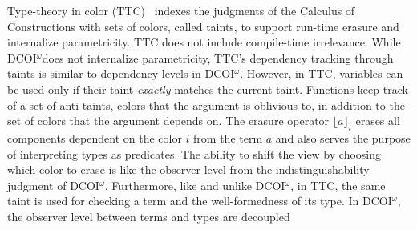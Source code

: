 \documentclass[acmsmall, screen=true, nonacm=true,
  review=\ifpublic false\else true\fi,
  anonymous=\ifanonymous true\else false\fi
]{acmart}
\makeatletter
\newcommand{\name}{\texorpdfstring{DCOI$^{\omega}$\@\xspace}{DCOI-omega}}
\providecommand{\DIFadd}[1]{{\protect\color{blue}\uwave{#1}}} %
\providecommand{\DIFaddbegin}{} %
\makeatother
\begin{document}


Type-theory in color (TTC)~\citep{bernardy:color} indexes the judgments of the
Calculus of Constructions with sets of colors, called taints, to support run-time erasure
and internalize parametricity. TTC does not include compile-time irrelevance.
While \name does not internalize parametricity, TTC's
dependency tracking through taints is similar to dependency levels in \name.
However, in TTC, variables can be used only if their
taint \emph{exactly} matches the current taint. Functions keep track of a
set of anti-taints, colors that the argument is oblivious to, in
addition to the set of colors that the argument depends on.
The erasure operator $\lfloor a
\rfloor_i$ erases all components dependent on the color $i$ from the
term $a$ and also serves the purpose of interpreting types as
predicates. The ability to shift the view by choosing which color to erase is like
the observer level from the indistinguishability
judgment of \name.
Furthermore, like \citet{pfenning:modal,
abel:irrelevance} and unlike \name, in TTC, the same taint is used for
checking a term and the well-formedness of its type. In \name, the
observer level between terms and types are decoupled\DIFaddbegin \DIFadd{.
}
\end{document}
